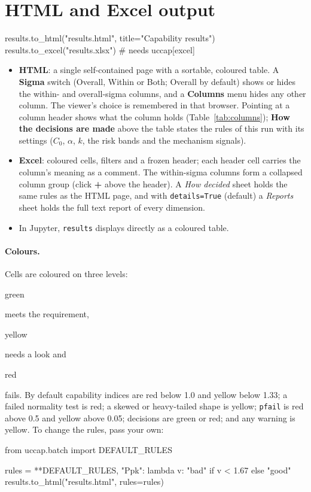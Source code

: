 \documentclass[a4paper,11pt,oneside,openany,parskip=half-,headings=standardclasses,toc=flat,numbers=noenddot]{scrbook}
\newcommand{\code}[1]{\texttt{\begingroup\def\_{\textunderscore\allowbreak}#1\endgroup}}
\newcommand{\tabref}[1]{Table~\ref{#1}}
\begin{document}
\section{HTML and Excel output}

\begin{pycode}
results.to_html("results.html", title="Capability results")
results.to_excel("results.xlsx")             # needs uccap[excel]
\end{pycode}

\begin{itemize}
\item \textbf{HTML}: a single self-contained page with a sortable, coloured table. A \textbf{Sigma} switch
  (Overall, Within or Both; Overall by default) shows or hides the within- and overall-sigma columns, and a
  \textbf{Columns} menu hides any other column. The viewer's choice is remembered in that browser. Pointing at a
  column header shows what the column holds (\tabref{tab:columns}); \textbf{How the decisions are made} above the
  table states the rules of this run with its settings ($C_0$, $\alpha$, $k$, the risk bands and the mechanism
  signals).
\item \textbf{Excel}: coloured cells, filters and a frozen header; each header cell carries the column's meaning as
  a comment. The within-sigma columns form a collapsed column group (click \textbf{+} above the header). A
  \emph{How decided} sheet holds the same rules as the HTML page, and with \code{details=True} (default) a
  \emph{Reports} sheet holds the full text report of every dimension.
\item In Jupyter, \code{results} displays directly as a coloured table.
\end{itemize}

\paragraph{Colours.} Cells are coloured on three levels:
\colorbox{good}{\strut green} meets the requirement, \colorbox{warn}{\strut yellow} needs a look and
\colorbox{bad}{\strut red} fails. By default capability indices are red below 1.0 and yellow below 1.33; a
failed normality test is red; a skewed or heavy-tailed shape is yellow; \code{p\_fail} is red above 0.5 and
yellow above 0.05; decisions are green or red; and any warning is yellow. To change the rules, pass your own:

\begin{pycode}
from uccap.batch import DEFAULT_RULES

rules = {**DEFAULT_RULES, "Ppk": lambda v: "bad" if v < 1.67 else "good"}
results.to_html("results.html", rules=rules)
\end{pycode}
\end{document}
